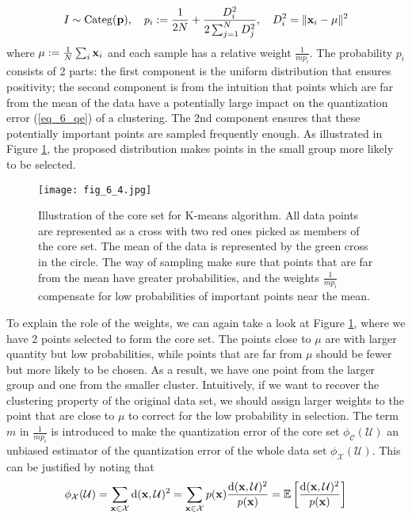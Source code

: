 \documentclass[../main.tex]{subfiles}
\begin{document}
\begin{equation*}
I\sim {\rm Categ}({\bf p}),\quad p_i:=\frac{1}{2N}+\frac{D_i^2}{2\sum_{j=1}^N D_j^2},\quad D_i^2=\|{\bf x}_i-\mu\|^2
\end{equation*}
where $\mu:=\frac{1}{N}\sum_i {\bf x}_i$ and each sample has a relative weight $\frac{1}{mp_i}$. The probability $p_i$ consists of 2 parts: the first component is the uniform distribution that ensures positivity; the second component is from the intuition that points which are far from the mean of the data have a potentially large impact on the quantization error (\ref{eq_6_qe}) of a clustering. The 2nd component ensures that these potentially important points are sampled frequently enough. As illustrated in Figure \ref{fig_6_4}, the proposed distribution makes points in the small group more likely to be selected.
\begin{figure}[t] 
	\centering 
	\texttt{[image: fig\_6\_4.jpg]} 
	\caption{Illustration of the core set for K-means algorithm. All data points are represented as a cross with two red ones picked as members of the core set. The mean of the data is represented by the green cross in the circle. The way of sampling make sure that points that are far from the mean have greater probabilities, and the weights $\frac{1}{mp_i}$ compensate for low probabilities of important points near the mean.}\label{fig_6_4}
\end{figure}
\par To explain the role of the weights, we can again take a look at Figure \ref{fig_6_4}, where we have 2 points selected to form the core set. The points close to $\mu$ are with larger quantity but low probabilities, while points that are far from $\mu$ should be fewer but more likely to be chosen. As a result, we have one point from the larger group and one from the smaller cluster. Intuitively, if we want to recover the clustering property of the original data set, we should assign larger weights to the point that are close to $\mu$ to correct for the low probability in selection. The term $m$ in $\frac{1}{mp_i}$ is introduced to make the quantization error of the core set $\phi_{\mathcal{C}}(\mathcal{U})$ an unbiased estimator of the quantization error of the whole data set $\phi_{\mathcal{X}}(\mathcal{U})$. This can be justified by noting that
\begin{equation*}
\phi_{\mathcal{X}}(\mathcal{U}) = \sum_{{\bf x}\in \mathcal{X}}{\rm d}({\bf x}, \mathcal{U})^2 = \sum_{{\bf x}\in \mathcal{X}}p({\bf x})\frac{{\rm d}({\bf x}, \mathcal{U})^2}{p({\bf x})} = \mathbb{E}\left[\frac{{\rm d}({\bf x}, \mathcal{U})^2}{p({\bf x})}\right]
\end{equation*}
\end{document}
